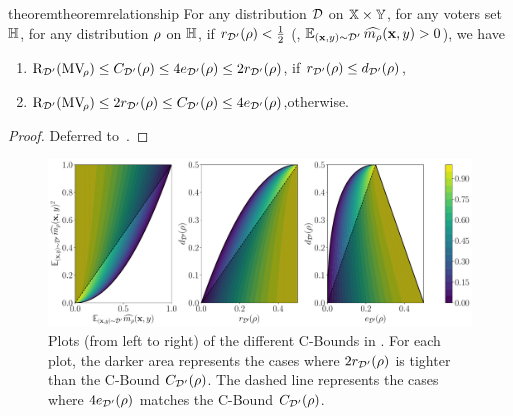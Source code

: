 \begin{restatable}{theorem}{theoremrelationship}\label{chap:pac-bayes:theorem:relationship}
 For any distribution $\mathcal{D}$ on $\mathbb{X}\times\mathbb{Y}$, for any voters set $\mathbb{H}$, for any distribution $\rho$ on $\mathbb{H}$, if $r_{\mathcal{D}'}(\rho) < \tfrac{1}{2}$ (\ie, $\operatorname*{\mathbb{E}}_{(\mathbf{x},y)\sim\mathcal{D}'}\widehat{m_{\rho}}(\mathbf{x},y) > 0$), we have
\begin{center}
\begin{enumerate}[\it (i)]
    \item $\text{R}_{\mathcal{D}'}(\text{MV}_{\!\rho}) \le C_{\mathcal{D}'}(\rho) \le 4e_{\mathcal{D}'}(\rho) \le 2r_{\mathcal{D}'}(\rho)$, if  $r_{\mathcal{D}'}(\rho) \le d_{\mathcal{D}'}(\rho)$,
    \item $\text{R}_{\mathcal{D}'}(\text{MV}_{\!\rho}) \le 2r_{\mathcal{D}'}(\rho) \le C_{\mathcal{D}'}(\rho) \le 4e_{\mathcal{D}'}(\rho)$,\quad otherwise.
\end{enumerate}
\end{center}
\end{restatable}
\begin{noaddcontents}\begin{proof}
Deferred to~.
\end{proof}\end{noaddcontents}

\begin{figure}
\includegraphics[width=1.0\textwidth]{chapter_2/figures/cbound.pdf}
\caption[Plots that Summarize the Relationship Between the Surrogates]{
Plots (from left to right) of the different C-Bounds in .
For each plot, the darker area represents the cases where $2r_{\mathcal{D}'}(\rho)$ is tighter than the C-Bound ${C}_{\mathcal{D}'}(\rho)$.
The  dashed line represents the cases where $4e_{\mathcal{D}'}(\rho)$ matches the C-Bound ${C}_{\mathcal{D}'}(\rho)$.
}
\label{chap:pac-bayes:fig:cbound}
\end{figure}



